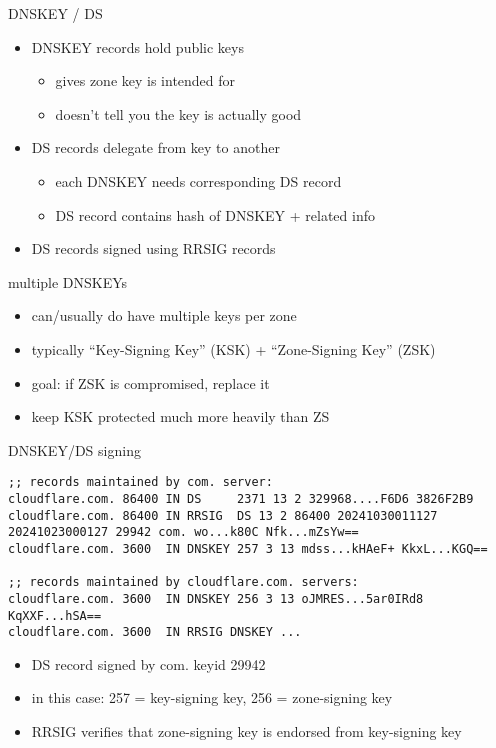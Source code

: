 \begin{frame}{DNSKEY / DS}
\begin{itemize}
    \item DNSKEY records hold public keys
        \begin{itemize}
        \item gives zone key is intended for
        \item doesn't tell you the key is actually good
        \end{itemize}
    \item DS records delegate from key to another
        \begin{itemize}
        \item each DNSKEY needs corresponding DS record
        \item DS record contains hash of DNSKEY + related info
        \end{itemize}
    \item DS records signed using RRSIG records
\end{itemize}
\end{frame}

\begin{frame}{multiple DNSKEYs}
    \begin{itemize}
    \item can/usually do have multiple keys per zone
    \item typically ``Key-Signing Key'' (KSK) + ``Zone-Signing Key'' (ZSK)
    \item goal: if ZSK is compromised, replace it
    \item keep KSK protected much more heavily than ZS
    \end{itemize}
\end{frame}

\begin{frame}[fragile]{DNSKEY/DS signing}
\begin{Verbatim}[fontsize=\fontsize{9}{10}]
;; records maintained by com. server:
cloudflare.com. 86400 IN DS     2371 13 2 329968....F6D6 3826F2B9
cloudflare.com. 86400 IN RRSIG  DS 13 2 86400 20241030011127 20241023000127 29942 com. wo...k80C Nfk...mZsYw==
cloudflare.com. 3600  IN DNSKEY 257 3 13 mdss...kHAeF+ KkxL...KGQ==

;; records maintained by cloudflare.com. servers:
cloudflare.com. 3600  IN DNSKEY 256 3 13 oJMRES...5ar0IRd8 KqXXF...hSA==
cloudflare.com. 3600  IN RRSIG DNSKEY ...
\end{Verbatim}
\begin{itemize}
\item DS record signed by com. keyid 29942
\item in this case: 257 = key-signing key, 256 = zone-signing key
\item RRSIG verifies that zone-signing key is endorsed from key-signing key
\end{itemize}
\end{frame}
